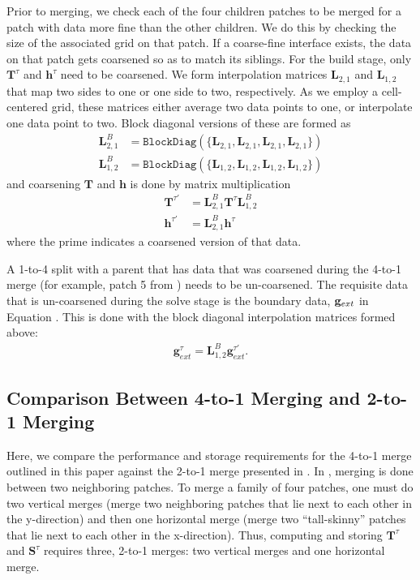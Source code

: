 Prior to merging, we check each of the four children patches to be merged for a patch with data more fine than the other children. We do this by checking the size of the associated grid on that patch. If a coarse-fine interface exists, the data on that patch gets coarsened so as to match its siblings. For the build stage, only $\mathbf{T}^{\tau}$ and $\textbf{h}^{\tau}$ need to be coarsened. We form interpolation matrices $\textbf{L}_{2,1}$ and $\textbf{L}_{1,2}$ that map two sides to one or one side to two, respectively. As we employ a cell-centered grid, these matrices either average two data points to one, or interpolate one data point to two. Block diagonal versions of these are formed as
\begin{align}
    \textbf{L}_{2,1}^{B} &= \texttt{BlockDiag}(\{\textbf{L}_{2,1}, \textbf{L}_{2,1}, \textbf{L}_{2,1}, \textbf{L}_{2,1}\}) \\
    \textbf{L}_{1,2}^{B} &= \texttt{BlockDiag}(\{\textbf{L}_{1,2}, \textbf{L}_{1,2}, \textbf{L}_{1,2}, \textbf{L}_{1,2}\})
\end{align}
and coarsening $\textbf{T}$ and $\textbf{h}$ is done by matrix multiplication
\begin{align}
    \textbf{T}^{\tau'} &= \textbf{L}_{2,1}^{B} \textbf{T}^{\tau} \textbf{L}_{1,2}^{B} \\
    \textbf{h}^{\tau'} &= \textbf{L}_{2,1}^{B} \textbf{h}^{\tau}
\end{align}
where the prime indicates a coarsened version of that data.

A 1-to-4 split with a parent that has data that was coarsened during the 4-to-1 merge (for example, patch 5 from ) needs to be un-coarsened. The requisite data that is un-coarsened during the solve stage is the boundary data, $\mathbf g_{ext}$ in Equation . This is done with the block diagonal interpolation matrices formed above:
\begin{align}
    \textbf{g}^{\tau}_{ext} = \textbf{L}_{1,2}^{B} \textbf{g}^{\tau'}_{ext}.
\end{align}

\subsection{Comparison Between 4-to-1 Merging and 2-to-1 Merging}
\label{sub:comparison_between_4t1_and2t1_merging}

Here, we compare the performance and storage requirements for the 4-to-1 merge outlined in this paper against the 2-to-1 merge presented in \citep{gillman2014direct}. In \citep{gillman2014direct}, merging is done between two neighboring patches. To merge a family of four patches, one must do two vertical merges (merge two neighboring patches that lie next to each other in the y-direction) and then one horizontal merge (merge two ``tall-skinny'' patches that lie next to each other in the x-direction). Thus, computing and storing $\textbf{T}^{\tau}$ and $\mathbf{S}^{\tau}$ requires three, 2-to-1 merges: two vertical merges and one horizontal merge.

